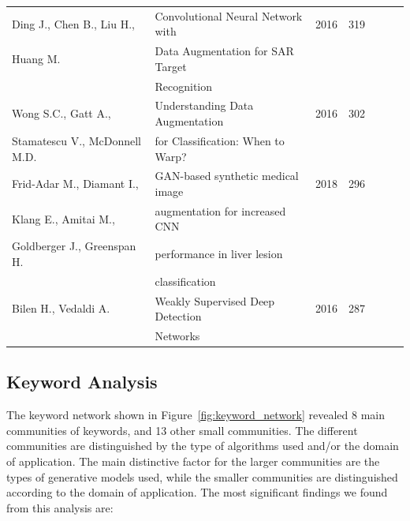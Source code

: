 \documentclass[parskip=full]{scrartcl}
\begin{document}
\begin{table}[ht]
\begin{center}
\begin{tabular*}{\textwidth}{@{\extracolsep{\fill}}lllllll@{\extracolsep{\fill}}}
        Ding J., Chen B., Liu H., & Convolutional Neural Network with & 2016 & 319 \\
        Huang M.                  & Data Augmentation for SAR Target && \\
        \vspace{.2cm}             & Recognition \\

        Wong S.C., Gatt A., & Understanding Data Augmentation & 2016 & 302 \\
        \vspace{.2cm}Stamatescu V., McDonnell M.D. & for Classification: When to Warp? && \\

        Frid-Adar M., Diamant I., & GAN-based synthetic medical image & 2018 & 296 \\
        Klang E., Amitai M., & augmentation for increased CNN && \\
        Goldberger J., Greenspan H. & performance in liver lesion && \\
        \vspace{.2cm}               & classification \\

        Bilen H., Vedaldi A. & Weakly Supervised Deep Detection & 2016 & 287 \\
        \vspace{.2cm}        & Networks \\

        \bottomrule
    \end{tabular*}
    \end{center}
\end{table}

\subsection{Keyword Analysis}

The keyword network shown in Figure~\ref{fig:keyword_network} revealed 8 main
communities of keywords, and 13 other small communities. The different
communities are distinguished by the type of algorithms used and/or the domain
of application. The main distinctive factor for the larger communities are the
types of generative models used, while the smaller communities are
distinguished according to the domain of application. The most significant
findings we found from this analysis are:
\end{document}
